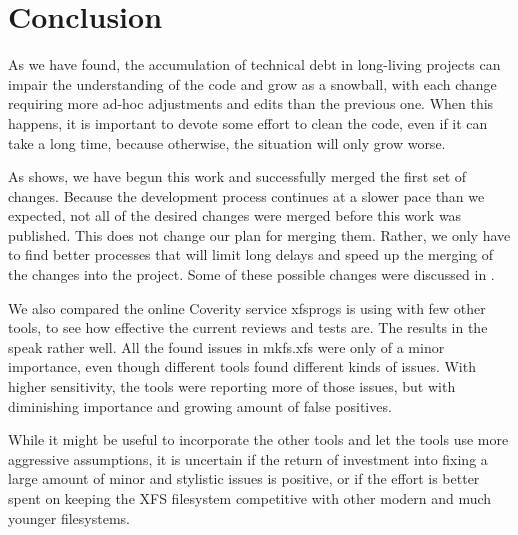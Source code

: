 
\chapter{Conclusion} \label{chap:conclusion}

As we have found, the accumulation of technical debt in long-living
projects can impair the understanding of the code and grow as a
snowball, with each change requiring more ad-hoc adjustments and edits than
the previous one. When this happens, it is important to devote some effort
to clean the code, even if it can take a long time, because otherwise, the
situation will only grow worse.

As  shows, we have begun this work and successfully
merged the first set of changes. Because the development process continues
at a slower pace than we expected, not all of the desired changes were
merged before this work was published. This does not change our plan for
merging them. Rather, we only have to find better processes that will limit
long delays and speed up the merging of the changes into the project. Some
of these possible changes were discussed in
.

We also compared the online Coverity service xfsprogs is using with few
other tools, to see how effective the current reviews and tests are. The
results in the  speak rather well. All the found issues
in mkfs.xfs were only of a minor importance, even though different tools
found different kinds of issues. With higher sensitivity, the tools were
reporting more of those issues, but with diminishing importance and growing
amount of false positives.

While it might be useful to incorporate the other tools and let the tools
use more aggressive assumptions, it is uncertain if the return of
investment into fixing a large amount of minor and stylistic issues is
positive, or if the effort is better spent on keeping the XFS filesystem
competitive with other modern and much younger filesystems.
